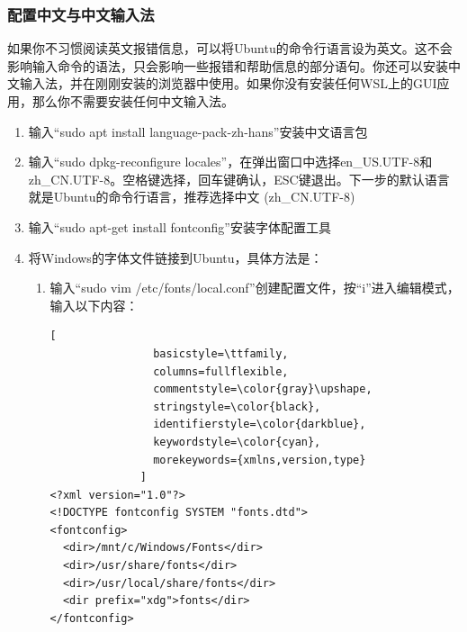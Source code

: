\documentclass[fontset=ubuntu]{ctexart}
\begin{document}
\subsubsection{配置中文与中文输入法}

如果你不习惯阅读英文报错信息，可以将Ubuntu的命令行语言设为英文\cite{monkeywie2021}。这不会影响输入命令的语法，只会影响一些报错和帮助信息的部分语句。你还可以安装中文输入法，并在刚刚安装的浏览器中使用。如果你没有安装任何WSL上的GUI应用，那么你不需要安装任何中文输入法。

\begin{enumerate}
    \item 输入“sudo apt install language-pack-zh-hans”安装中文语言包
    \item 输入“sudo dpkg-reconfigure locales”，在弹出窗口中选择en\_US.UTF-8和zh\_CN.UTF-8。空格键选择，回车键确认，ESC键退出。下一步的默认语言就是Ubuntu的命令行语言，推荐选择中文 (zh\_CN.UTF-8)
    \item 输入“sudo apt-get install fontconfig”安装字体配置工具
    \item 将Windows的字体文件链接到Ubuntu，具体方法是：
          \begin{enumerate}
              \item 输入“sudo vim /etc/fonts/local.conf”创建配置文件，按“i”进入编辑模式，输入以下内容：
                    \begin{lstlisting}[
                basicstyle=\ttfamily,
                columns=fullflexible,
                commentstyle=\color{gray}\upshape,
                stringstyle=\color{black},
                identifierstyle=\color{darkblue},
                keywordstyle=\color{cyan},
                morekeywords={xmlns,version,type}
              ]
<?xml version="1.0"?>
<!DOCTYPE fontconfig SYSTEM "fonts.dtd">
<fontconfig>
  <dir>/mnt/c/Windows/Fonts</dir>
  <dir>/usr/share/fonts</dir>
  <dir>/usr/local/share/fonts</dir>
  <dir prefix="xdg">fonts</dir>
</fontconfig>
              \end{lstlisting}


\end{enumerate}
\end{enumerate}
\end{document}
